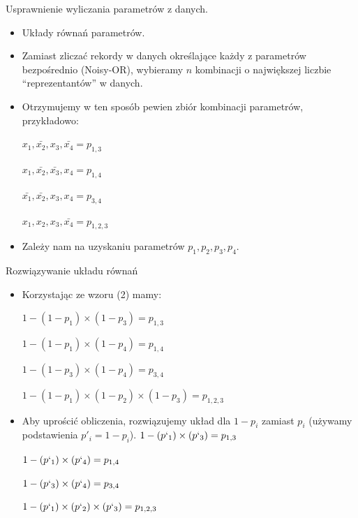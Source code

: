 \documentclass{beamer}
\begin{document}
\begin{frame}{Usprawnienie wyliczania parametrów z danych.}
	\begin{itemize}
		\item Układy równań parametrów.
		\pause \item Zamiast zliczać rekordy w danych określające każdy z parametrów bezpośrednio (Noisy-OR), wybieramy $n$ kombinacji o największej liczbie ``reprezentantów'' w danych.
		\pause \item Otrzymujemy w ten sposób pewien zbiór kombinacji parametrów, przykładowo:

			$x_1, \bar{x_2}, x_3, \bar{x_4} = p_{1,3}$

			$x_1, \bar{x_2}, \bar{x_3}, x_4 = p_{1,4}$

			$\bar{x_1}, \bar{x_2}, x_3, x_4 = p_{3,4}$

			$x_1, x_2, x_3, \bar{x_4} = p_{1,2,3}$
		\pause \item Zależy nam na uzyskaniu parametrów $p_1, p_2, p_3, p_4$.
	\end{itemize}
\end{frame}

\begin{frame}{Rozwiązywanie układu równań}
	\begin{itemize}
		\item Korzystając ze wzoru (2) mamy:

		$1 - (1-p_1)\times(1-p_3) = p_{1,3}$

		$1 - (1-p_1)\times(1-p_4) = p_{1,4}$

		$1 - (1-p_3)\times(1-p_4) = p_{3,4}$

		$1 - (1-p_1)\times(1-p_2)\times(1-p_3) = p_{1,2,3}$

		\pause \item Aby uprościć obliczenia, rozwiązujemy układ dla $1-p_i$ zamiast $p_i$ (używamy podstawienia $p'_i = 1 - p_i$).
		\pause
		$1 - (p`_1)\times(p`_3) = p_{1,3}$

		$1 - (p`_1)\times(p`_4) = p_{1,4}$

		$1 - (p`_3)\times(p`_4) = p_{3,4}$

		$1 - (p`_1)\times(p`_2)\times(p`_3) = p_{1,2,3}$
	\end{itemize}
\end{frame}
\end{document}
